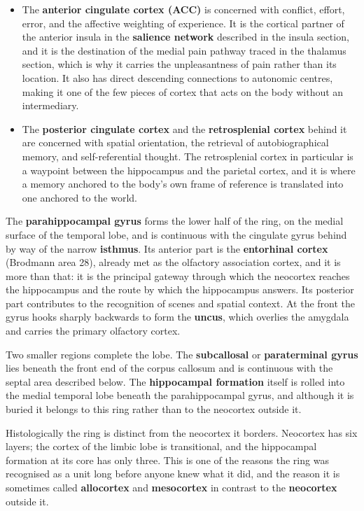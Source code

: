 \documentclass[11pt]{article}
\begin{document}
\begin{itemize}
    \item The \textbf{anterior cingulate cortex (ACC)} is concerned with conflict, effort, error, and the affective weighting of experience. It is the cortical partner of the anterior insula in the \textbf{salience network} described in the insula section, and it is the destination of the medial pain pathway traced in the thalamus section, which is why it carries the unpleasantness of pain rather than its location. It also has direct descending connections to autonomic centres, making it one of the few pieces of cortex that acts on the body without an intermediary.
    \item The \textbf{posterior cingulate cortex} and the \textbf{retrosplenial cortex} behind it are concerned with spatial orientation, the retrieval of autobiographical memory, and self-referential thought. The retrosplenial cortex in particular is a waypoint between the hippocampus and the parietal cortex, and it is where a memory anchored to the body's own frame of reference is translated into one anchored to the world.
\end{itemize}

The \textbf{parahippocampal gyrus} forms the lower half of the ring, on the medial surface of the temporal lobe, and is continuous with the cingulate gyrus behind by way of the narrow \textbf{isthmus}. Its anterior part is the \textbf{entorhinal cortex} (Brodmann area 28), already met as the olfactory association cortex, and it is more than that: it is the principal gateway through which the neocortex reaches the hippocampus and the route by which the hippocampus answers. Its posterior part contributes to the recognition of scenes and spatial context. At the front the gyrus hooks sharply backwards to form the \textbf{uncus}, which overlies the amygdala and carries the primary olfactory cortex.

Two smaller regions complete the lobe. The \textbf{subcallosal} or \textbf{paraterminal gyrus} lies beneath the front end of the corpus callosum and is continuous with the septal area described below. The \textbf{hippocampal formation} itself is rolled into the medial temporal lobe beneath the parahippocampal gyrus, and although it is buried it belongs to this ring rather than to the neocortex outside it.

Histologically the ring is distinct from the neocortex it borders. Neocortex has six layers; the cortex of the limbic lobe is transitional, and the hippocampal formation at its core has only three. This is one of the reasons the ring was recognised as a unit long before anyone knew what it did, and the reason it is sometimes called \textbf{allocortex} and \textbf{mesocortex} in contrast to the \textbf{neocortex} outside it.
\end{document}
